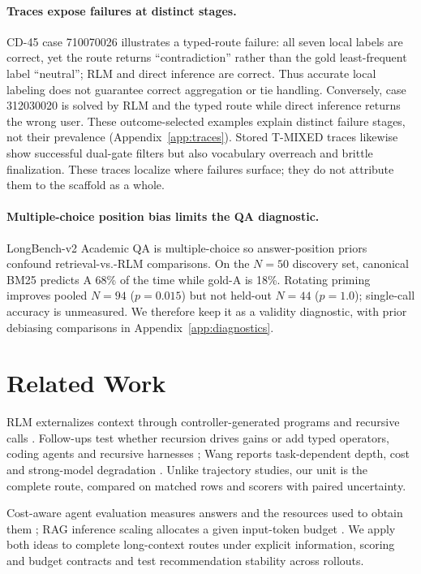 \documentclass{article}
\begin{document}
\paragraph{Traces expose failures at distinct stages.}
CD-45 case 710070026 illustrates a typed-route failure: all seven local labels are correct, yet the route returns ``contradiction'' rather than the gold least-frequent label ``neutral''; RLM and direct inference are correct. Thus accurate local labeling does not guarantee correct aggregation or tie handling. Conversely, case 312030020 is solved by RLM and the typed route while direct inference returns the wrong user. These outcome-selected examples explain distinct failure stages, not their prevalence (Appendix~\ref{app:traces}). Stored T-MIXED traces likewise show successful dual-gate filters but also vocabulary overreach and brittle finalization. These traces localize where failures surface; they do not attribute them to the scaffold as a whole.

\paragraph{Multiple-choice position bias limits the QA diagnostic.}
LongBench-v2 Academic QA is multiple-choice so answer-position priors confound retrieval-vs.-RLM comparisons. On the $N{=}50$ discovery set, canonical BM25 predicts A 68\% of the time while gold-A is 18\%. Rotating priming improves pooled $N{=}94$ ($p{=}0.015$) but not held-out $N{=}44$ ($p{=}1.0$); single-call accuracy is unmeasured. We therefore keep it as a validity diagnostic, with prior debiasing comparisons in Appendix~\ref{app:diagnostics}.

\section{Related Work}

RLM externalizes context through controller-generated programs and recursive calls \citep{zhang2025rlm}. Follow-ups test whether recursion drives gains or add typed operators, coding agents and recursive harnesses \citep{srlm2026,lambdarlm2026,ehrlich2026lcm,cao2026codingagents,lumer2026rah}; Wang reports task-dependent depth, cost and strong-model degradation \citep{wang2026thinkdontoverthink}. Unlike trajectory studies, our unit is the complete route, compared on matched rows and scorers with paired uncertainty.

Cost-aware agent evaluation measures answers and the resources used to obtain them \citep{kapoor2024agentsmatter,kapoor2026hal,bragg2026astabench}; RAG inference scaling allocates a given input-token budget \citep{yue2025inferencescaling}. We apply both ideas to complete long-context routes under explicit information, scoring and budget contracts and test recommendation stability across rollouts.
\end{document}
